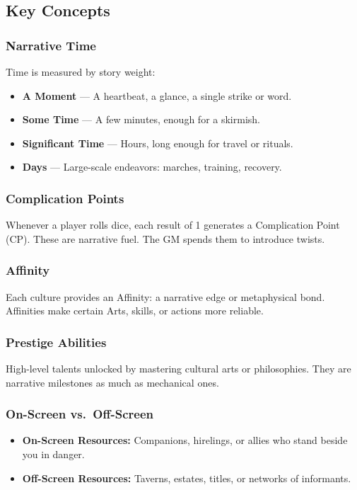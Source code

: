 \subsection{Key Concepts}

\subsubsection{Narrative Time}
Time is measured by story weight:
\begin{itemize}
  \item \textbf{A Moment} --- A heartbeat, a glance, a single strike or word.
  \item \textbf{Some Time} --- A few minutes, enough for a skirmish.
  \item \textbf{Significant Time} --- Hours, long enough for travel or rituals.
  \item \textbf{Days} --- Large-scale endeavors: marches, training, recovery.
\end{itemize}

\subsubsection{Complication Points}
Whenever a player rolls dice, each result of 1 generates a Complication Point (CP). These are narrative fuel. The GM spends them to introduce twists.

\subsubsection{Affinity}
Each culture provides an Affinity: a narrative edge or metaphysical bond. Affinities make certain Arts, skills, or actions more reliable.

\subsubsection{Prestige Abilities}
High-level talents unlocked by mastering cultural arts or philosophies. They are narrative milestones as much as mechanical ones.

\subsubsection{On-Screen vs.\ Off-Screen}
\begin{itemize}
  \item \textbf{On-Screen Resources:} Companions, hirelings, or allies who stand beside you in danger.
  \item \textbf{Off-Screen Resources:} Taverns, estates, titles, or networks of informants.
\end{itemize}
